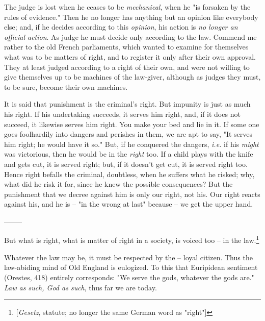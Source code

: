 \documentclass[a4paper]{book}
\begin{document}
The judge is lost when he ceases to be \textit{mechanical}, when he "{}is 
forsaken by the rules of evidence."{} Then he no longer has anything but an 
opinion like everybody else; and, if he decides according to this 
\textit{opinion}, his action is \textit{no longer an official action}. As 
judge he must decide only according to the law. Commend me rather to the old 
French parliaments, which wanted to examine for themselves what was to be 
matters of right, and to register it only after their own approval. They at 
least judged according to a right of their own, and were not willing to give 
themselves up to be machines of the law-giver, although as judges they must, 
to be sure, become their own machines.

It is said that punishment is the criminal's right. But impunity is just as 
much his right. If his undertaking succeeds, it serves him right, and, if it 
does not succeed, it likewise serves him right. You make your bed and lie in 
it. If some one goes foolhardily into dangers and perishes in them, we are apt 
to say, "{}It serves him right; he would have it so."{} But, if he conquered 
the dangers, \textit{i.e.} if his \textit{might} was victorious, then he would 
be in the \textit{right} too. If a child plays with the knife and gets cut, it 
is served right; but, if it doesn't get cut, it is served right too. Hence 
right befalls the criminal, doubtless, when he suffers what he risked; why, 
what did he risk it for, since he knew the possible consequences? But the 
punishment that we decree against him is only our right, not his. Our right 
reacts against his, and he is -- "{}in the wrong at last"{} because -- we get 
the upper hand.

\begin{center}
--------\end{center}


But what is right, what is matter of right in a society, is voiced too -- in 
the law.\footnote{[\textit{Gesetz}, statute; no longer the same German word as 
"{}right"{}]}

Whatever the law may be, it must be respected by the -- loyal citizen. Thus 
the law-abiding mind of Old England is eulogized. To this that Euripidean 
sentiment (Orestes, 418) entirely corresponds: "{}We serve the gods, whatever 
the gods are."{} \textit{Law as such, God as such}, thus far we are today.
\end{document}
